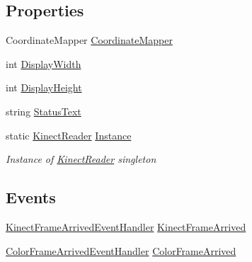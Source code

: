 \subsection*{Properties}
\begin{DoxyCompactItemize}
\item 
Coordinate\+Mapper \hyperlink{class_rowing_monitor_1_1_model_1_1_kinect_reader_a6e16165a91a0d690370503db49999c30}{Coordinate\+Mapper}
\item 
int \hyperlink{class_rowing_monitor_1_1_model_1_1_kinect_reader_a533cac2f9a8e2aebf5251c5538598b6d}{Display\+Width}
\item 
int \hyperlink{class_rowing_monitor_1_1_model_1_1_kinect_reader_aff2b7f5c2516877b8c935ba41407c8b6}{Display\+Height}
\item 
string \hyperlink{class_rowing_monitor_1_1_model_1_1_kinect_reader_a1296b7cedf2c5e566169b8dcea55bc68}{Status\+Text}
\item 
static \hyperlink{class_rowing_monitor_1_1_model_1_1_kinect_reader}{Kinect\+Reader} \hyperlink{class_rowing_monitor_1_1_model_1_1_kinect_reader_abbe1ba4562963cf386d14d27841ba5ab}{Instance}
\begin{DoxyCompactList}\small\item\em Instance of \hyperlink{class_rowing_monitor_1_1_model_1_1_kinect_reader}{Kinect\+Reader} singleton \end{DoxyCompactList}\end{DoxyCompactItemize}
\subsection*{Events}
\begin{DoxyCompactItemize}
\item 
\hyperlink{class_rowing_monitor_1_1_model_1_1_kinect_reader_ae6568e9b233e8878ac21662617702571}{Kinect\+Frame\+Arrived\+Event\+Handler} \hyperlink{class_rowing_monitor_1_1_model_1_1_kinect_reader_ae3bd87154cb1ed9a8fddf3d25db09a06}{Kinect\+Frame\+Arrived}
\item 
\hyperlink{class_rowing_monitor_1_1_model_1_1_kinect_reader_a2c9c0a937275cbabf12954725b54ddb8}{Color\+Frame\+Arrived\+Event\+Handler} \hyperlink{class_rowing_monitor_1_1_model_1_1_kinect_reader_acfb84abd48dd27e54f3be804026d5682}{Color\+Frame\+Arrived}
\end{DoxyCompactItemize}


